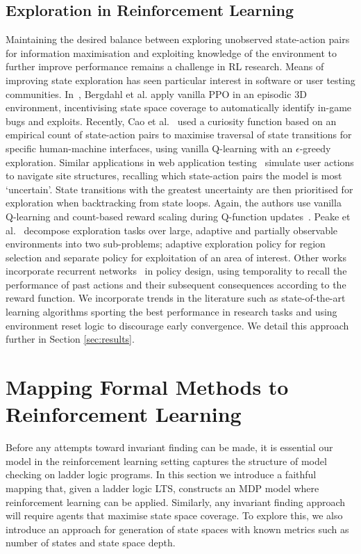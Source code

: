 \documentclass[runningheads]{llncs}
\begin{document}
\subsection{Exploration in Reinforcement Learning}
Maintaining the desired balance between exploring unobserved state-action pairs for information maximisation and exploiting knowledge of the environment to further improve performance remains a challenge in RL research. Means of improving state exploration has seen particular interest in software or user testing communities. In~\cite{9231552}, Bergdahl et al. apply vanilla PPO in an episodic 3D environment, incentivising state space coverage to automatically identify in-game bugs and exploits. Recently, Cao et al.~\cite{9678703} used a curiosity function based on an empirical count of state-action pairs to maximise traversal of state transitions for specific human-machine interfaces, using vanilla Q-learning with an $\epsilon$-greedy exploration. Similar applications in web application testing~\cite{9402046} simulate user actions to navigate site structures, recalling which state-action pairs the model is most `uncertain'. State transitions with the greatest uncertainty are then prioritised for exploration when backtracking from state loops. Again, the authors use vanilla Q-learning and count-based reward scaling during Q-function updates~\cite{tang2017exploration}. Peake et al.~\cite{9476756} decompose exploration tasks over large, adaptive and partially observable environments into two sub-problems; adaptive exploration policy for region selection and separate policy for exploitation of an area of interest. Other works~\cite{s21041067} incorporate recurrent networks~\cite{medsker2001recurrent} in policy design, using temporality to recall the performance of past actions and their subsequent consequences according to the reward function. We incorporate trends in the literature such as state-of-the-art learning algorithms sporting the best performance in research tasks and using environment reset logic to discourage early convergence. We detail this approach further in Section \ref{sec:results}.


\section{Mapping Formal Methods to Reinforcement Learning} \label{sec:mapping_fm_to_ml}

Before any attempts toward invariant finding can be made, it is essential our model in the reinforcement learning setting captures the structure of model checking on ladder logic programs. In this section we introduce a faithful mapping that, given a ladder logic LTS, constructs an MDP model where reinforcement learning can be applied. Similarly, any invariant finding approach will require agents that maximise state space coverage. To explore this, we also introduce an approach for generation of state spaces with known metrics such as number of states and state space depth.
\end{document}
